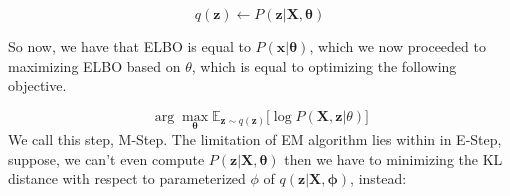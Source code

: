 $$
q(\boldsymbol{z}) \leftarrow P( \boldsymbol{z} |\boldsymbol{X} , \boldsymbol{\theta})
$$

So now, we have that ELBO is equal to $P(\boldsymbol{x} | \boldsymbol{\theta})$, which we now proceeded to maximizing ELBO based on $\theta$, which is equal to optimizing the following objective. 

\begin{equation}
    \arg\max_{\boldsymbol{\theta}} \mathbb{E}_{\boldsymbol{z} \sim q(\boldsymbol{z})}\big[\log P(\boldsymbol{X}, \boldsymbol{z} | \theta)\big]
\end{equation}
We call this step, M-Step. The limitation of EM algorithm lies within in E-Step, suppose, we can't even compute $P( \boldsymbol{z} |\boldsymbol{X} , \boldsymbol{\theta})$ then we have to minimizing the KL distance with respect to parameterized $\phi$ of $q(\boldsymbol{z} | \boldsymbol{X}, \boldsymbol{\phi})$, instead: 

